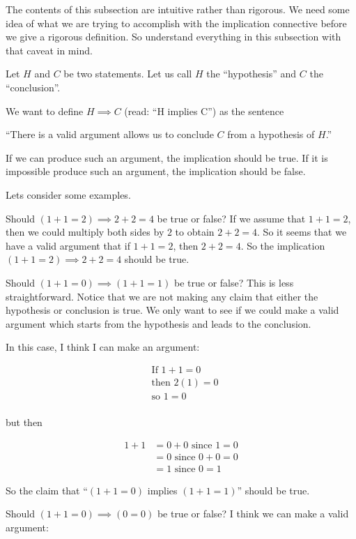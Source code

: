 The contents of this subsection are intuitive rather than rigorous.  We need some idea of what we are trying to accomplish with the implication connective before we give a rigorous definition.  So understand everything in this subsection with that caveat in mind.

Let $H$ and $C$ be two statements. Let us call $H$ the ``hypothesis'' and $C$ the ``conclusion''.

We want to define $H \implies C$ (read: ``H implies C'') as the sentence


	``There is a valid argument allows us to conclude $C$ from a hypothesis of $H$.''


 If we can produce such an argument, the implication should be true.  If it is impossible produce such an argument, the implication should be false.

Lets consider some examples.

Should $(1+1 = 2) \implies 2+2 = 4$ be true or false?  If we assume that $1+1 = 2$, then we could multiply both sides by $2$ to obtain $2+2 = 4$.  So it seems that we have a valid argument that if $1+1 = 2$, then $2+2 = 4$.  So the implication $(1+1 = 2) \implies 2+2 = 4$ should be true.

Should $(1+1 = 0) \implies (1+1 = 1)$ be true or false?  This is less straightforward.  Notice that we are not making any claim that either the hypothesis or conclusion is true.  We only want to see if we could make a valid argument which starts from the hypothesis and leads to the conclusion.

In this case, I think I can make an argument:

\begin{align*}
&\textrm{If } 	1+1 =0\\
&\textrm{then } 	2(1) = 0\\
&\textrm{so }	1 =0\\ 
\end{align*}

but then

\begin{align*}
	1+ 1 & = 0+ 0 \textrm{ since $1=0$}\\
	&= 0 \textrm{ since $0+0 =0$}\\
	&= 1 \textrm{ since $0 = 1$}
\end{align*}

So the claim that ``$(1+1 = 0)$ implies $(1+1 = 1)$'' should be true.

Should $(1+1 = 0) \implies (0 = 0)$ be true or false? I think we can make a valid argument:

